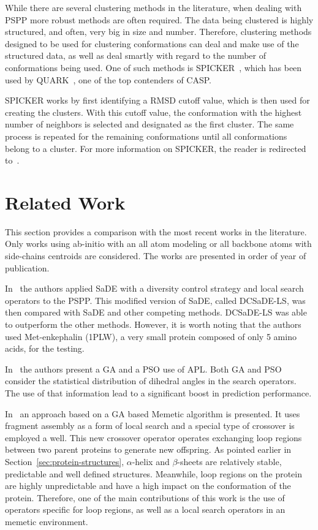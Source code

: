 While there are several clustering methods in the literature, when dealing with
\ac{PSPP} more robust methods are often required. The data being clustered is
highly structured, and often, very big in size and number. Therefore, clustering
methods designed to be used for clustering conformations can deal and make use
of the structured data, as well as deal smartly with regard to the number of
conformations being used. One of such methods is SPICKER~\cite{zhang2004spicker},
which has been used by QUARK~\cite{xu2012ab}, one of the top contenders of CASP.

SPICKER works by first identifying a \ac{RMSD} cutoff value, which is then used
for creating the clusters. With this cutoff value, the conformation with the
highest number of neighbors is selected and designated as the first cluster.
The same process is repeated for the remaining conformations until all
conformations belong to a cluster. For more information on SPICKER, the reader
is redirected to~\cite{zhang2004spicker}.

\section{Related Work}
\label{sec:related_works}

This section provides a comparison with the most recent works in the literature.
Only works using ab-initio with an all atom modeling or all backbone atoms with
side-chains centroids are considered. The works are presented in order of year
of publication.

In~\cite{sudha2015protein} the authors applied \ac{SaDE} with a diversity control
strategy and local search operators to the PSPP. This modified version of
\ac{SaDE}, called DCSaDE-LS, was then compared with \ac{SaDE} and other
competing methods. DCSaDE-LS was able to outperform the other methods. However,
it is worth noting that the authors used Met-enkephalin (1PLW), a very small
protein composed of only 5 amino acids, for the testing.

In~\cite{borguesan2015apl} the authors present a \ac{GA} and a \ac{PSO} use
of \ac{APL}. Both \ac{GA} and \ac{PSO} consider the statistical distribution of
dihedral angles in the search operators. The use of that information lead to a
significant boost in prediction performance.

In~\cite{garza2016generating} an approach based on a GA based Memetic algorithm
is presented. It uses fragment assembly as a form of local search and a special
type of crossover is employed a well. This new crossover operator operates
exchanging loop regions between two parent proteins to generate new offspring.
As pointed earlier in Section~\ref{sec:protein-structures}, $\alpha$-helix and
$\beta$-sheets are relatively stable, predictable and well defined structures.
Meanwhile, loop regions on the protein are highly unpredictable and have a high
impact on the conformation of the protein. Therefore, one of the main
contributions of this work is the use of operators specific for loop regions,
as well as a local search operators in an memetic environment.

